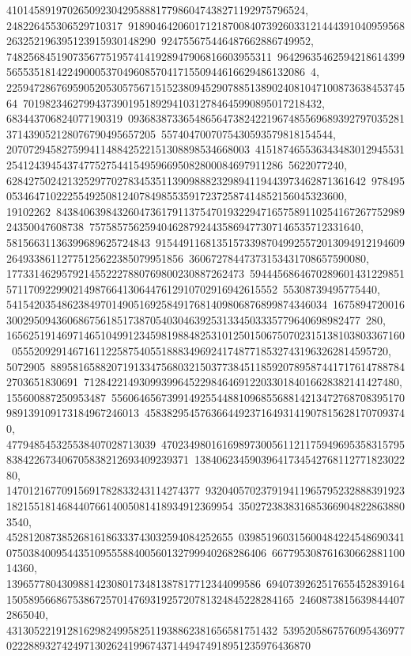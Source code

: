 {{{410145891970265092304295888177986047438271192975796524, 248226455306529710317\
91890464206017121870084073926033121444391040959568263252196395123915930148290\
924755675446487662886749952, 748256845190735677519574141928947906816603955311\
96429635462594218614399565535181422490005370496085704171550944616629486132086\
4, 22594728676959052053057567151523809452907885138902408104710087363845374564\
701982346279943739019518929410312784645990895017218432, 683443706824077190319\
09368387336548656473824221967485569689392797035281371439052128076790495657205\
5574047007075430593579818154544, 20707294582759941148842522151308898534668003\
41518746553634348301294553125412439454374775275441549596695082800084697911286\
5622077240, 62842750242132529770278345351139098882329894119443973462871361642\
9784950534647102225549250812407849855359172372587414852156045323600, 19102262\
84384063984326047361791137547019322947165758911025416726775298924350047608738\
7575857562594046287924435869477307146535712331640, 58156631136399689625724843\
91544911681351573398704992557201309491219460926493386112775125622385079951856\
36067278447373153431708657590080, 1773314629579214552227880769800230887262473\
59444568646702896014312298515711709229902149876641306447612910702916942615552\
55308739495775440, 5415420354862384970149051692584917681409806876899874346034\
16758947200163002950943606867561851738705403046392531334503335779640698982477\
280, 165625191469714651049912345981988482531012501506750702315138103803367160\
05552092914671611225875405518883496924174877185327431963262814595720, 5072905\
88958165882071913347568032150377384511859207895874417176147887842703651830691\
712842214930993996452298464691220330184016628382141427480, 155600887250953487\
55606465673991492554488109685568814213472768708395170989139109173184967246013\
458382954576366449237164931419078156281707093740, 477948545325538407028713039\
47023498016169897300561121175949695358315795838422673406705838212693409239371\
1384062345903964173454276811277182302280, 14701216770915691782833243114274377\
93204057023791941196579523288839192318215518146844076614005081418934912369954\
3502723838316853669048228638803540, 45281208738526816186333743032594084252655\
03985196031560048422454869034107503840095443510955588400560132799940268286406\
66779530876163066288110014360, 1396577804309881423080173481387817712344099586\
69407392625176554528391641505895668675386725701476931925720781324845228284165\
24608738156398444072865040, 4313052219128162982499582511938862381656581751432\
53952058675760954369770222889327424971302624199674371449474918951235976436870\
}}}

